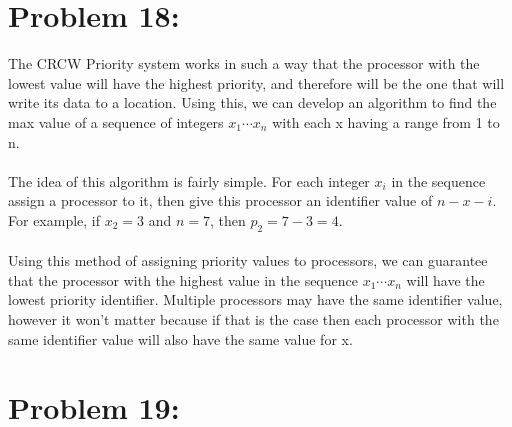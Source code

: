 \documentclass[12pt]{article}
\begin{document}
\section*{Problem 18: }
The CRCW Priority system works in such a way that the processor with the lowest value will have the highest priority, and therefore will be the one that will write its data to a location. Using this, we can develop an algorithm to find the max value of a sequence of integers {$x_1 \cdots x_n$} with each x having a range from 1 to n.\\\\
The idea of this algorithm is fairly simple. For each integer {$x_i$} in the sequence assign a processor to it, then give this processor an identifier value of {$n - x-i$}. For example, if {$x_2 = 3$} and {$n = 7$}, then {$p_2 = 7 - 3 = 4$}.\\\\
Using this method of assigning priority values to processors, we can guarantee that the processor with the highest value in the sequence {$x_1 \cdots x_n$} will have the lowest priority identifier. Multiple processors may have the same identifier value, however it won't matter because if that is the case then each processor with the same identifier value will also have the same value for x.
\section*{Problem 19: }
\end{document}
